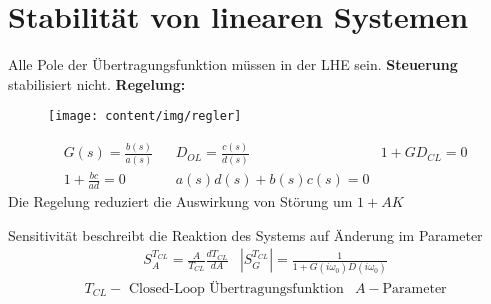 \setcounter{section}{5}
\section{Stabilität von linearen Systemen}
\begin{tcolorbox}[colback=white!10!white,colframe=green!30!black,title=Stabilität] 
Alle Pole der Übertragungsfunktion müssen in der LHE sein. \textbf{Steuerung} stabilisiert nicht. 
\textbf{Regelung:}

    \begin{figure}[H]
        \centering
        \texttt{[image: content/img/regler]}
\end{figure}
    \begin{align*}
    &G(s) = \frac{b(s)}{a(s)}  && D_{OL} = \frac{c(s)}{d(s)}
    &1+ G D_{CL} = 0\\ 
    &1 + \frac{bc}{ad} = 0  &&
    a(s)d(s) + b(s)c(s) = 0 
    \end{align*}
Die Regelung reduziert die Auswirkung von Störung um $1+ AK$

\end{tcolorbox}

\begin{tcolorbox}[colback=white!10!white,colframe=green!30!black,title=Sensitivität] 
    Sensitivität beschreibt die Reaktion des Systems auf Änderung im Parameter
    \begin{align*}
        & S_{A}^{T_{CL}} = \frac{A}{T_{CL}}\frac{d T_{CL}}{dA}
        & |S_{G}^{T_{CL}}| = \frac{1}{1+G(i\omega_0)D(i\omega_0)}
        \end{align*}
    \begin{align*}
        &T_{CL} -\text{ Closed-Loop Übertragungsfunktion} & A - \text{Parameter}
    \end{align*}
\end{tcolorbox}



